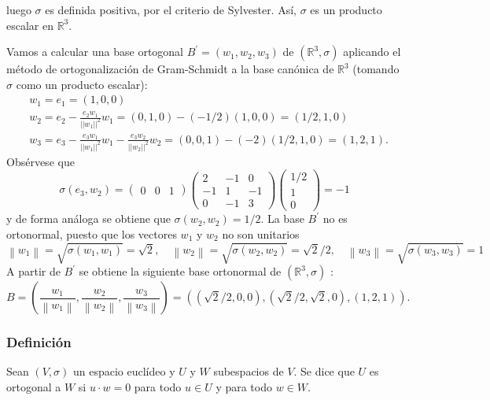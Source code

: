 \documentclass[12pt, a4paper, ones, notitlepage, openany,titlepage]{article}
\begin{document}
luego $\sigma$ es definida positiva, por el criterio de Sylvester. Así, $\sigma$ es un producto escalar en $\mathbb{R}^{3}$.

Vamos a calcular una base ortogonal $B^{\prime}=\left(w_{1}, w_{2}, w_{3}\right)$ de $\left(\mathbb{R}^{3}, \sigma\right)$ aplicando el método de ortogonalización de Gram-Schmidt a la base canónica de $\mathbb{R}^{3}$ (tomando $\sigma$ como un producto escalar):
$$
\begin{aligned}
	& w_{1}=e_{1}=(1,0,0) \\
	& w_{2}=e_{2}-\frac{e_{2} w_{1}}{||w_{1}||^2} w_{1}=(0,1,0)-(-1 / 2)(1,0,0)=(1 / 2,1,0) \\
	& w_{3}=e_{3}-\frac{e_{3} w_{1}}{||w_{1}||^2} w_{1}-\frac{e_{3} w_{2}}{||w_{2}||^2} w_{2}=(0,0,1)-(-2)(1 / 2,1,0)=(1,2,1) .
\end{aligned}
$$
Obsérvese que
$$
\sigma\left(e_{3}, w_{2}\right)=\left(\begin{array}{lll}
	0 & 0 & 1
\end{array}\right)\left(\begin{array}{rrr}
	2 & -1 & 0 \\
	-1 & 1 & -1 \\
	0 & -1 & 3
\end{array}\right)\left(\begin{array}{r}
	1 / 2 \\
	1 \\
	0
\end{array}\right)=-1
$$
y de forma análoga se obtiene que $\sigma\left(w_{2}, w_{2}\right)=1 / 2$. La base $B^{\prime}$ no es ortonormal, puesto que los vectores $w_{1}$ y $w_{2}$ no son unitarios
$$
\left\|w_{1}\right\|=\sqrt{\sigma\left(w_{1}, w_{1}\right)}=\sqrt{2}, \quad\left\|w_{2}\right\|=\sqrt{\sigma\left(w_{2}, w_{2}\right)}=\sqrt{2} / 2, \quad\left\|w_{3}\right\|=\sqrt{\sigma\left(w_{3}, w_{3}\right)}=1
$$
A partir de $B^{\prime}$ se obtiene la siguiente base ortonormal de $\left(\mathbb{R}^{3}, \sigma\right)$ :
$$
B=\left(\frac{w_{1}}{\left\|w_{1}\right\|}, \frac{w_{2}}{\left\|w_{2}\right\|}, \frac{w_{3}}{\left\|w_{3}\right\|}\right)=((\sqrt{2} / 2,0,0),(\sqrt{2} / 2, \sqrt{2}, 0),(1,2,1)) .
$$

\subsubsection{Definición}
Sean $(V, \sigma)$ un espacio euclídeo y $U$ y $W$ subespacios de $V$. Se dice que $U$ es ortogonal a $W$ si $u \cdot w=0$ para todo $u \in U$ y para todo $w \in W$.
\end{document}
